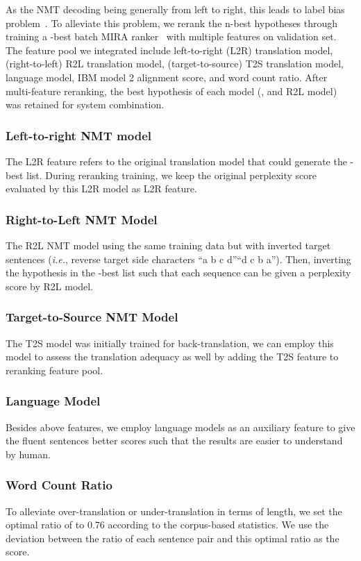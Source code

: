 \documentclass[11pt,a4paper]{article}
\begin{document}
As the NMT decoding being generally from left to right, this leads to label bias problem~\cite{lafferty2001conditional}. To alleviate this problem, we rerank the n-best hypotheses through training a -best batch MIRA ranker~\cite{Cherry:2012:BTS:2382029.2382089} with multiple features on validation set. The feature pool we integrated include left-to-right (L2R) translation model, (right-to-left) R2L translation model, (target-to-source) T2S translation model, language model, IBM model 2 alignment score, and word count ratio. After multi-feature reranking, the best hypothesis of each model (,  and R2L model) was retained for system combination.

\subsubsection{Left-to-right NMT model}
The L2R feature refers to the original translation model that could generate the -best list. During reranking training, we keep the original perplexity score evaluated by this L2R model as L2R feature.

\subsubsection{Right-to-Left NMT Model}
The R2L NMT model using the same training data but with inverted target sentences (\textit{i.e.}, reverse target side characters ``a b c d''``d c b a''). Then, inverting the hypothesis in the -best list such that each sequence can be given a perplexity score by R2L model.

\subsubsection{Target-to-Source NMT Model}
The T2S model was initially trained for back-translation, we can employ this model to assess the translation adequacy as well by adding the T2S feature to reranking feature pool.

\subsubsection{Language Model}
Besides above features, we employ language models as an auxiliary feature to give the fluent sentences better scores such that the results are easier to understand by human.

\subsubsection{Word Count Ratio}
To alleviate over-translation or under-translation in terms of length, we set the optimal ratio of  to 0.76 according to the corpus-based statistics. We use the deviation between the ratio of each sentence pair and this optimal ratio as the score.
\end{document}
